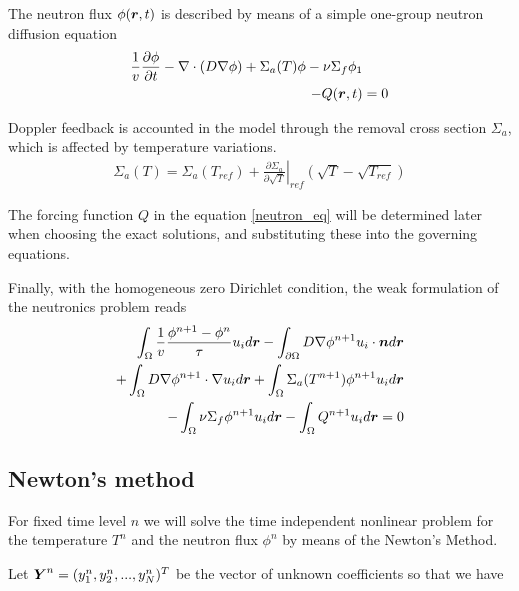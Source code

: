 The neutron flux $\phi(\boldsymbol{r},t)$ is described by means of a simple one-group neutron diffusion equation
\begin{align}
  \frac{1}{v} \frac{\partial\phi}{\partial t} 
  - \nabla\cdot(D \nabla \phi) 
  + \Sigma_{a}(T) \phi 
  - \nu \Sigma_{f} \phi_1& \nonumber \\
  - Q(\boldsymbol{r},t) &= 0 \label{neutron_eq}
\end{align}

Doppler feedback is accounted in the model through the removal cross section $\Sigma_{a}$, which is affected by temperature variations.
\begin{align}
  \Sigma_{a}(T) = \Sigma_{a}(T_{ref}) 
  + \left. \frac{\partial \Sigma_{a}}{\partial \sqrt{T}}\right|_{ref} 
    \left( \sqrt{T} - \sqrt{T_{ref}} \right)
\end{align}

The forcing function $Q$ in the equation \eqref{neutron_eq} will be determined later when choosing the exact solutions, and substituting these into the governing equations.

Finally, with the homogeneous zero Dirichlet condition, the weak formulation of the neutronics problem reads
\begin{align}
  \int_{\Omega} \frac{1}{v} \frac{\phi^{n+1}-\phi{^n}}{\tau} u_i d\boldsymbol{r} 
  - \int_{\partial\Omega} D \nabla \phi^{n+1} u_i \cdot \boldsymbol{n} d\boldsymbol{r}& \nonumber \\
  + \int_{\Omega} D \nabla \phi^{n+1} \cdot \nabla u_i d\boldsymbol{r} 
  + \int_{\Omega} \Sigma_{a}(T^{n+1}) \phi^{n+1} u_i d\boldsymbol{r}& \nonumber \\
  - \int_{\Omega} \nu \Sigma_{f} \phi^{n+1} u_i d\boldsymbol{r} 
  - \int_{\Omega} Q^{n+1} u_i d\boldsymbol{r} = 0&
\end{align}



\subsection*{Newton's method}
For fixed time level $n$ we will solve the time independent nonlinear problem for the temperature $T^{n}$ and the neutron flux $\phi^{n}$ by means of the Newton's Method.

Let $\boldsymbol{Y}^n = (y_1^n,y_2^n,...,y_N^n)^T$ be the vector of unknown coefficients so that we have

